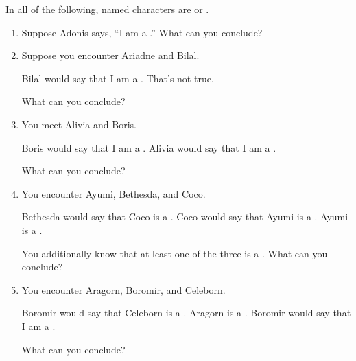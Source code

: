 \probsec{~\ref{sec:knights-knaves}}

  In all of the following, named characters are \knights or \knaves.

\begin{enumerate}
    \item Suppose Adonis says, ``I am a \knight.'' What can you conclude?

    \item Suppose you encounter Ariadne and Bilal.
  \begin{dialogue}
     Bilal would say that I am a \knight.
     That's not true.
  \end{dialogue}
  What can you conclude?

    \item You meet Alivia and Boris.
  \begin{dialogue}
     Boris would say that I am a \knave.
     Alivia would say that I am a \knight.
  \end{dialogue}
  What can you conclude?

    \item You encounter Ayumi, Bethesda, and Coco.
  \begin{dialogue}
     Bethesda would say that Coco is a \knave.
     Coco would say that Ayumi is a \knave.
     Ayumi is a \knight.
  \end{dialogue} 
  You additionally know that at least one of the three is a \knight. What can you conclude?

  \item You encounter Aragorn, Boromir, and Celeborn.
  \begin{dialogue}
     Boromir would say that Celeborn is a \knave.
     Aragorn is a \knave.
     Boromir would say that I am a \knave.
  \end{dialogue}
  What can you conclude?
\end{enumerate}

